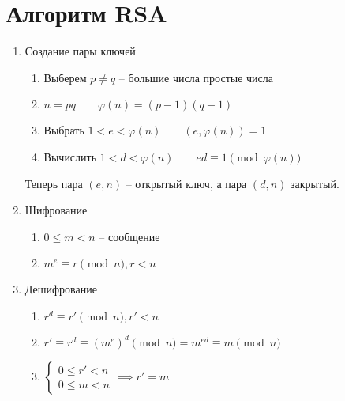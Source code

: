 \documentclass[main]{subfiles}
\begin{document}
\section{Алгоритм RSA}
\begin{enumerate}
    \item Создание пары ключей
          \begin{enumerate}
              \item Выберем $p \neq q$ -- большие числа простые числа
              \item $n = pq \qquad \varphi(n) = (p-1)(q-1)$
              \item Выбрать $1< e < \varphi(n) \qquad (e, \varphi(n))=1$
              \item Вычислить $1< d < \varphi(n) \qquad ed \equiv 1 \pmod{\varphi(n)}$
          \end{enumerate}
          Теперь пара $(e,n)$ -- открытый ключ, а пара $(d,n)$ закрытый.
    \item Шифрование
          \begin{enumerate}
              \item $0\le m < n$ -- сообщение
              \item $m^e \equiv r \pmod{n}, r<n$
          \end{enumerate}
    \item Дешифрование
          \begin{enumerate}
              \item $r^d \equiv r' \pmod{n}, r' < n$
              \item $r' \equiv r^d \equiv (m^e)^d \pmod{n} = m^{ed} \equiv m \pmod{n}$
              \item $\begin{cases}
                            0 \le r' < n \\
                            0 \le m < n
                        \end{cases} \implies r' = m$
          \end{enumerate}
\end{enumerate}
\end{document}
